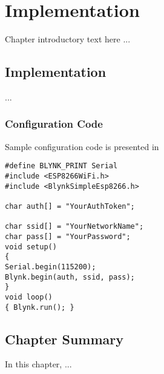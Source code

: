 \chapter{Implementation}
Chapter introductory text here ...

\section{Implementation}
...

\subsection{Configuration Code}
Sample configuration code  is  presented  in  
\lstset{language=c, showstringspaces=false, tabsize=1, breaklines=true, breakatwhitespace=false, framexleftmargin=20pt,numbers=left, 
numberstyle=\small,numbersep=10pt,frame=single,captionpos=t,xleftmargin=.061\textwidth}
\begin{center}
\begin{lstlisting}[caption=NodeMCU Configuration Code, label=nodemcuconfig]
#define BLYNK_PRINT Serial   
#include <ESP8266WiFi.h>
#include <BlynkSimpleEsp8266.h>

char auth[] = "YourAuthToken";

char ssid[] = "YourNetworkName";
char pass[] = "YourPassword";
void setup()
{
Serial.begin(115200);
Blynk.begin(auth, ssid, pass);
}
void loop()
{ Blynk.run(); }

\end{lstlisting}
\end{center}


\section{Chapter Summary}
In this chapter, ...





